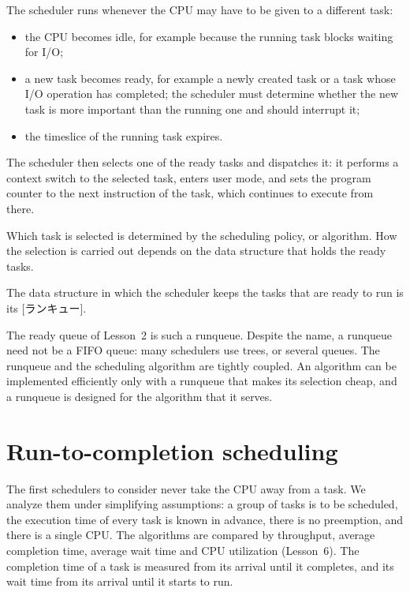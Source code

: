 \documentclass[../main.tex]{subfiles}
\begin{document}
The scheduler runs whenever the CPU may have to be given to a different
task:
\begin{itemize}
  \item the CPU becomes idle, for example because the running task blocks
    waiting for I/O;
  \item a new task becomes ready, for example a newly created task or a task
    whose I/O operation has completed; the scheduler must determine whether
    the new task is more important than the running one and should interrupt
    it;
  \item the timeslice of the running task expires.
\end{itemize}
The scheduler then selects one of the ready tasks and dispatches it: it
performs a context switch to the selected task, enters user mode, and sets
the program counter to the next instruction of the task, which continues to
execute from there.

Which task is selected is determined by the scheduling policy, or
algorithm.  How the selection is carried out depends on the data structure
that holds the ready tasks.

\begin{definition}[Runqueue]
  The data structure in which the scheduler keeps the tasks that are ready
  to run is its [ランキュー].
\end{definition}

The ready queue of Lesson~2 is such a runqueue.  Despite the name, a
runqueue need not be a FIFO queue: many schedulers use trees, or several
queues.  The runqueue and the
scheduling algorithm are tightly coupled.  An algorithm can be implemented
efficiently only with a runqueue that makes its selection cheap, and a
runqueue is designed for the algorithm that it serves.

\section{Run-to-completion scheduling}
\label{sec:l07-rtc}

The first schedulers to consider never take the CPU away from a
task.  We analyze them under simplifying
assumptions: a group of tasks is to be scheduled, the execution time of
every task is known in advance, there is no preemption, and there is a
single CPU.  The algorithms are compared by throughput, average completion
time, average wait time and CPU utilization (Lesson~6).  The completion time
of a task is measured from its arrival until it completes, and its wait
time from its arrival until it starts to run.
\end{document}
